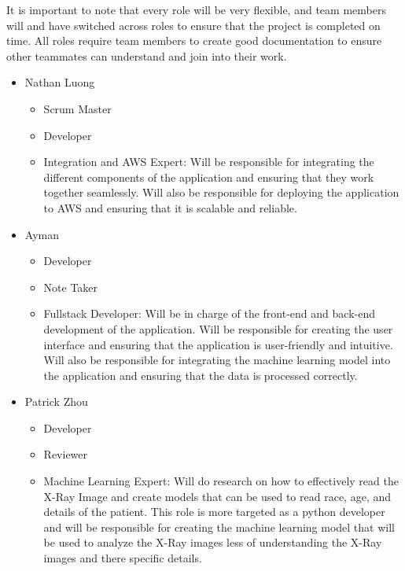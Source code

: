 \documentclass{article}
\begin{document}
It is important to note that every role will be very flexible, and team members will and have switched across roles to ensure that the project is completed on time. All roles require team members to create good documentation to ensure other teammates can understand and join into their work.

\begin{itemize}
\item Nathan Luong
    \begin{itemize}
        \item Scrum Master
        \item Developer
        \item Integration and AWS Expert: Will be responsible for integrating the different components of the application and ensuring that they work together seamlessly. Will also be responsible for deploying the application to AWS and ensuring that it is scalable and reliable.
    \end{itemize}
    \item Ayman
    \begin{itemize}
        \item Developer
        \item Note Taker
        \item Fullstack Developer: Will be in charge of the front-end and back-end development of the application. Will be responsible for creating the user interface and ensuring that the application is user-friendly and intuitive. Will also be responsible for integrating the machine learning model into the application and ensuring that the data is processed correctly.
    \end{itemize}
\item Patrick Zhou
    \begin{itemize}
        \item Developer
        \item Reviewer
        \item Machine Learning Expert: Will do research on how to effectively read the X-Ray Image and create models that can be used to read race, age, and details of the patient. This role is more targeted as a python developer and will be responsible for creating the machine learning model that will be used to analyze the X-Ray images less of understanding the X-Ray images and there specific details.
    \end{itemize}
        

\end{itemize}
\end{document}

